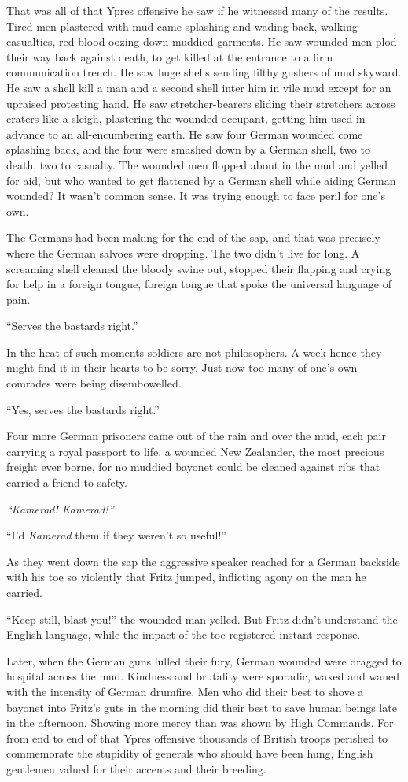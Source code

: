 That was all of that Ypres offensive he saw if he witnessed many of the results. Tired men plastered with mud came splashing and wading back, walking casualties, red blood oozing down muddied garments. He saw wounded men plod their way back against death, to get killed at the entrance to a firm communication trench. He saw huge shells sending filthy gushers of mud skyward. He saw a shell kill a man and a second shell inter him in vile mud except for an upraised protesting hand. He saw stretcher-bearers sliding their stretchers across craters like a sleigh, plastering the wounded occupant, getting him used in advance to an all-encumbering earth. He saw four German wounded come splashing back, and the four were smashed down by a German shell, two to death, two to casualty. The wounded men flopped about in the mud and yelled for aid, but who wanted to get flattened by a German shell while aiding German wounded? It wasn't common sense. It was trying enough to face peril for one's own.

The Germans had been making for the end of the sap, and that was precisely where the German salvoes were dropping. The two didn't live for long. A screaming shell cleaned the bloody swine out, stopped their flapping and crying for help in a foreign tongue, foreign tongue that spoke the universal language of pain.

``Serves the bastards right.''

In the heat of such moments soldiers are not philosophers. A week hence they might find it in their hearts to be sorry. Just now too many of one's own comrades were being disembowelled.

``Yes, serves the bastards right.''

Four more German prisoners came out of the rain and over the mud, each pair carrying a royal passport to life, a wounded New Zealander, the most precious freight ever borne, for no muddied bayonet could be cleaned against ribs that carried a friend to safety.

\emph{``Kamerad! Kamerad!''}

``I'd \emph{Kamerad} them if they weren't so useful!''

As they went down the sap the aggressive speaker reached for a German backside with his toe so violently that Fritz jumped, inflicting agony on the man he carried.

``Keep still, blast you!'' the wounded man yelled. But Fritz didn't understand the English language, while the impact of the toe registered instant response.

Later, when the German guns lulled their fury, German wounded were dragged to hospital across the mud. Kindness and brutality were sporadic, waxed and waned with the intensity of German drumfire. Men who did their best to shove a bayonet into Fritz's guts in the morning did their best to save human beings late in the afternoon. Showing more mercy than was shown by High Commands. For from end to end of that Ypres offensive thousands of British troops perished to commemorate the stupidity of generals who should have been hung, English gentlemen valued for their accents and their breeding.





